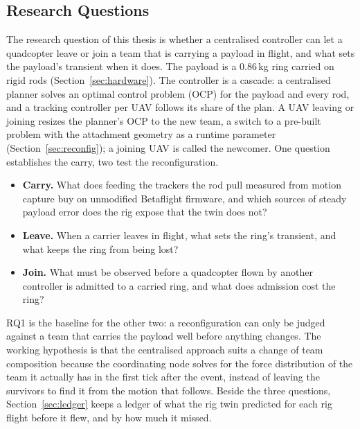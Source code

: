 
\subsection{Research Questions}
\label{sec:rq}

The research question of this thesis is whether a centralised controller can let a quadcopter leave or join
a team that is carrying a payload in flight, and what sets the payload's transient when it does. The payload
is a 0.86\,kg ring carried on rigid rods (Section~\ref{sec:hardware}). The controller is a cascade: a
centralised planner solves an optimal control problem (OCP) for the payload and every rod, and a tracking
controller per UAV follows its share of the plan. A UAV leaving or joining resizes the planner's OCP to the
new team, a switch to a pre-built problem with the attachment geometry as a runtime parameter
(Section~\ref{sec:reconfig}); a joining UAV is called the newcomer. One question establishes the carry, two
test the reconfiguration.
\begin{itemize}[leftmargin=3.6em, labelwidth=3.0em, labelsep=0.6em, align=left]
    \item[\textbf{RQ1}] \textbf{Carry.} What does feeding the trackers the rod pull measured from motion
    capture buy on unmodified Betaflight firmware, and which sources of steady payload error does the rig
    expose that the twin does not?
    \item[\textbf{RQ2}] \textbf{Leave.} When a carrier leaves in flight, what sets the ring's transient, and what
    keeps the ring from being lost?
    \item[\textbf{RQ3}] \textbf{Join.} What must be observed before a quadcopter flown by another controller is
    admitted to a carried ring, and what does admission cost the ring?
\end{itemize}
RQ1 is the baseline for the other two: a reconfiguration can only be judged against a team that carries the
payload well before anything changes. The working hypothesis is that the centralised approach suits a change
of team composition because the coordinating node solves for the force distribution of the team it actually
has in the first tick after the event, instead of leaving the survivors to find it from the motion that
follows. Beside the three questions, Section~\ref{sec:ledger} keeps a ledger of what the rig twin predicted
for each rig flight before it flew, and by how much it missed.

